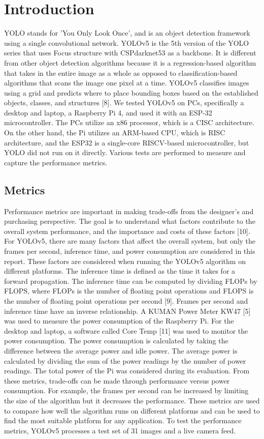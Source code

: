 \documentclass[Report]{IEEEtran}
\begin{document}
\section{Introduction}
YOLO stands for 'You Only Look Once', and is an object detection framework using a single convolutional network. YOLOv5 is the 5th version of the YOLO series that uses Focus structure with CSPdarknet53 as a backbone. It is different from other object detection algorithms because it is a regression-based algorithm that takes in the entire image as a whole as opposed to classification-based algorithms that scans the image one pixel at a time. YOLOv5 classifies images using a grid and predicts where to place bounding boxes based on the established objects, classes, and structures [8]. We tested YOLOv5 on PCs, specifically a desktop and laptop, a Raspberry Pi 4, and used it with an ESP-32 microcontroller. The PCs utilize an x86 processor, which is a CISC architecture. On the other hand, the Pi utilizes an ARM-based CPU, which is RISC architecture, and the ESP32 is a single-core RISCV-based microcontroller, but YOLO did not run on it directly. Various tests are performed to measure and capture the performance metrics. 

\subsection{Metrics}
Performance metrics are important in making trade-offs from the designer's and purchasing perspective. The goal is to understand what factors contribute to the overall system performance, and the importance and costs of these factors [10]. For YOLOv5, there are many factors that affect the overall system, but only the frames per second, inference time, and power consumption are considered in this report. These factors are considered when running the YOLOv5 algorithm on different platforms. The inference time is defined as the time it takes for a forward propagation. The inference time can be computed by dividing FLOPs by FLOPS, where FLOPs is the number of floating point operations and FLOPS is the number of floating point operations per second [9]. Frames per second and inference time have an inverse relationship. A KUMAN Power Meter KW47 [5] was used to measure the power consumption of the Raspberry Pi. For the desktop and laptop, a software called Core Temp [11] was used to monitor the power consumption. The power consumption is calculated by taking the difference between the average power and idle power. The average power is calculated by dividing the sum of the power readings by the number of power readings. The total power of the Pi was considered during its evaluation. From these metrics, trade-offs can be made through performance versus power consumption. For example, the frames per second can be increased by limiting the size of the algorithm but it decreases the performance. These metrics are used to compare how well the algorithm runs on different platforms and can be used to find the most suitable platform for any application. To test the performance metrics, YOLOv5 processes a test set of 31 images and a live camera feed.
\end{document}
